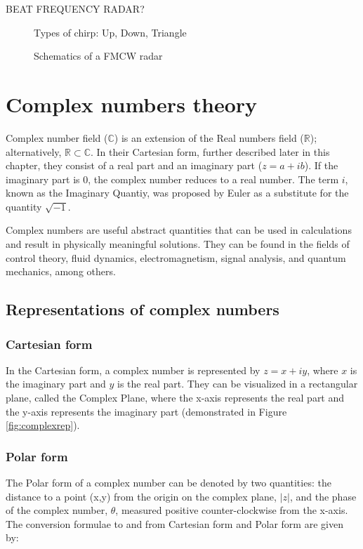 BEAT FREQUENCY RADAR? 
  

\begin{figure}[htb]
	\centering
	\epsfxsize=4.5cm
	{}
	{}
	{}
	\caption{Types of chirp: Up, Down, Triangle}
	\label{fig:chirps}
\end{figure}

\begin{figure}[htb]
	\centering
	\epsfxsize=14cm
	{}
	\caption{Schematics of a FMCW radar}
	\label{fig:fmcwrad}
\end{figure}



\section{Complex numbers theory}

Complex number field ($\mathbb{C}$) is an extension of the Real numbers field ($\mathbb{R}$); alternatively, $\mathbb{R}\subset\mathbb{C}$. In their Cartesian form, further described later in this chapter, they consist of a real part and an imaginary part ($z=a+ib$). If the imaginary part is $0$, the complex number reduces to a real number. The term $i$, known as the Imaginary Quantiy, was proposed by Euler as a substitute for the quantity $\sqrt{-1}$. 

Complex numbers are useful abstract quantities that can be used in calculations and result in physically meaningful solutions. They can be found in the fields of control theory, fluid dynamics, electromagnetism, signal analysis, and quantum mechanics, among others.



\subsection{Representations of complex numbers}

\subsubsection{Cartesian form}
In the Cartesian form, a complex number is represented by $z=x+iy$, where $x$ is the imaginary part and $y$ is the real part. They can be visualized in a rectangular plane, called the Complex Plane, where the x-axis represents the real part and the y-axis represents the imaginary part (demonstrated in Figure \ref{fig:complexrep}). 

\subsubsection{Polar form}
The Polar form of a complex number can be denoted by two quantities: 
the distance to a point (x,y) from the origin on the complex plane, $|z|$, and the phase of the complex number, $\theta$, measured positive counter-clockwise from the x-axis. The conversion formulae to and from Cartesian form and Polar form are given by:






